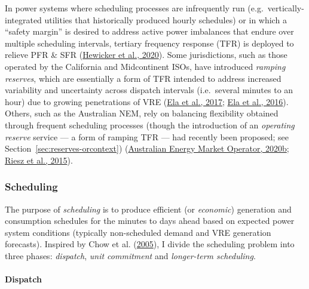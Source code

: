 \documentclass[12pt,a4paper,]{report}
\begin{document}
In power systems where scheduling processes are infrequently run
(e.g.~vertically-integrated utilities that historically produced hourly
schedules) or in which a ``safety margin'' is desired to address active
power imbalances that endure over multiple scheduling intervals,
tertiary frequency response (TFR) is deployed to relieve PFR \& SFR
(\protect\hyperlink{ref-hewickerDimensioningControlReserves2020}{Hewicker
et al., 2020}). Some jurisdictions, such as those operated by the
California and Midcontinent ISOs, have introduced \emph{ramping
reserves}, which are essentially a form of TFR intended to address
increased variability and uncertainty across dispatch intervals
(i.e.~several minutes to an hour) due to growing penetrations of VRE
(\protect\hyperlink{ref-elaElectricityMarketsRenewables2017}{Ela et al.,
2017}; \protect\hyperlink{ref-elaWholesaleElectricityMarket2016}{Ela et
al., 2016}). Others, such as the Australian NEM, rely on balancing
flexibility obtained through frequent scheduling processes (though the
introduction of an \emph{operating reserve} service --- a form of
ramping TFR --- had recently been proposed; see
Section~\ref{sec:reserves-orcontext})
(\protect\hyperlink{ref-australianenergymarketoperatorPowerSystemRequirements2020}{Australian
Energy Market Operator, 2020b};
\protect\hyperlink{ref-rieszFrequencyControlAncillary2015}{Riesz et al.,
2015}).

\hypertarget{sec:lit_review-balancing_practices-scheduling}{%
\subsubsection{Scheduling}\label{sec:lit_review-balancing_practices-scheduling}}

The purpose of \emph{scheduling} is to produce efficient (or
\emph{economic}) generation and consumption schedules for the minutes to
days ahead based on expected power system conditions (typically
non-scheduled demand and VRE generation forecasts). Inspired by Chow et
al. (\protect\hyperlink{ref-chowElectricityMarketDesign2005}{2005}), I
divide the scheduling problem into three phases: \emph{dispatch},
\emph{unit commitment} and \emph{longer-term scheduling}.

\hypertarget{dispatch}{%
\paragraph{Dispatch}\label{dispatch}}
\end{document}
